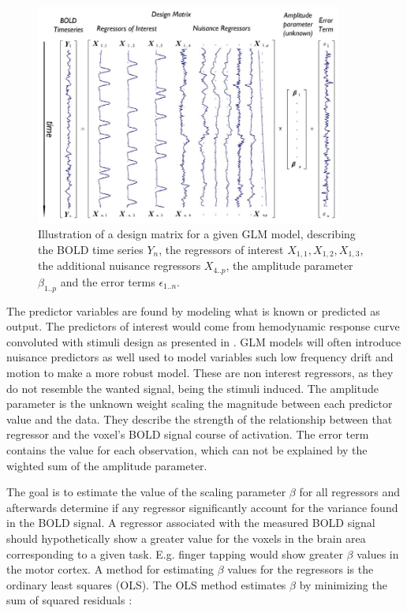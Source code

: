 \begin{figure}[H] 
	\includegraphics[width=0.90\textwidth]{figures/aBackground/GLM}
	\caption{Illustration of a design matrix for a given GLM model, describing the BOLD time series $Y_n$, the regressors of interest $X_{1,1}, X_{1,2}, X_{1,3}$, the additional nuisance regressors $X_{4..p}$, the amplitude parameter $\beta_{1..p}$ and the error terms $\epsilon_{1..n}$. \cite{Monti2011}}
	\label{fig:GLM}
\end{figure}



The predictor variables are found by modeling what is known or predicted as output. The predictors of interest would come from hemodynamic response curve convoluted with stimuli design as presented in . GLM models will often introduce nuisance predictors as well used to model variables such low frequency drift and motion to make a more robust model. These are non interest regressors, as they do not resemble the wanted signal, being the stimuli induced. The amplitude parameter is the unknown weight scaling the magnitude between each predictor value and the data. They describe the strength of the relationship between that regressor and the voxel's BOLD signal course of activation. The error term contains the value for each observation, which can not be explained by the wighted sum of the amplitude parameter. \cite{Moayedi2018,Monti2011} 

The goal is to estimate the value of the scaling parameter $\beta$ for all regressors and afterwards determine if any regressor significantly account for the variance found in the BOLD signal. A regressor associated with the measured BOLD signal should hypothetically show a greater value for the voxels in the brain area corresponding to a given task. E.g. finger tapping would show greater $\beta$ values in the motor cortex. A method for estimating $\beta$ values for the regressors is the ordinary least squares (OLS). The OLS method estimates $\beta$ by minimizing the sum of squared residuals \cite{Monti2011}: 

